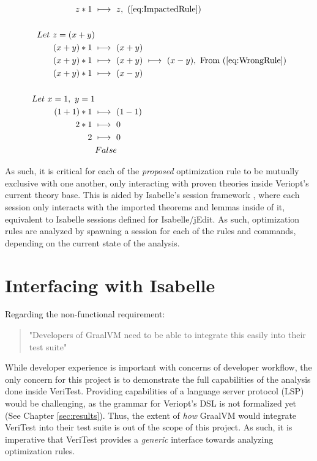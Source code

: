\begin{align}
    z * 1\ &\longmapsto\ z,\ \text{(\ref{eq:ImpactedRule})} \\
    \nonumber \\
    Let\ z = (x + y) \\
    (x + y) * 1\ &\longmapsto\ (x + y) \\
    (x + y) * 1\ &\longmapsto\ (x + y)\ \longmapsto\ (x - y),\ \text{From (\ref{eq:WrongRule})} \\
    (x + y) * 1\ &\longmapsto\ (x - y) \\
    \nonumber \\
    Let\ x = 1,\ y = 1 \\
    (1 + 1) * 1\ &\longmapsto\ (1 - 1) \\
    2 * 1\ &\longmapsto\ 0 \\
    2\ &\longmapsto\ 0 \\
    &False
\end{align}

As such, it is critical for each of the \emph{proposed} optimization rule to be mutually exclusive with one another, only interacting with 
proven theories inside Veriopt's current theory base. This is aided by Isabelle's session framework \cite[Ch. 2]{isabelleSystem}, where 
each session only interacts with the imported theorems and lemmas inside of it, equivalent to Isabelle sessions defined for Isabelle/jEdit.
As such, optimization rules are analyzed by spawning a session for each of the rules and commands, depending on the current state of the 
analysis.

\section{Interfacing with Isabelle}
\label{sec:interface}

Regarding the non-functional requirement: 

\begin{quote}
    "Developers of GraalVM need to be able to integrate this easily into their test suite"
\end{quote}

While developer experience is important with concerns of developer workflow, the only concern for this project is to demonstrate the full 
capabilities of the analysis done inside VeriTest. Providing capabilities of a language server protocol (LSP) would be challenging, 
as the grammar for Veriopt's DSL is not formalized yet (See Chapter \ref{sec:results}). Thus, the extent of \emph{how} GraalVM would integrate 
VeriTest into their test suite is out of the scope of this project. As such, it is imperative that VeriTest provides a \emph{generic} interface 
towards analyzing optimization rules.

